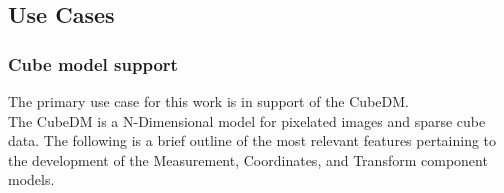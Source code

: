 \documentclass[11pt,a4paper]{ivoa}
\begin{document}
\subsection{Use Cases}
\label{sect:usecases}

\subsubsection{Cube model support}
\label{uc:Cube-model-support}
  The primary use case for this work is in support of the CubeDM. \\
  The CubeDM is a N-Dimensional model for pixelated images and sparse cube data.  
  The following is a brief outline of the most relevant features pertaining to the
  development of the Measurement, Coordinates, and Transform component models.
\end{document}

